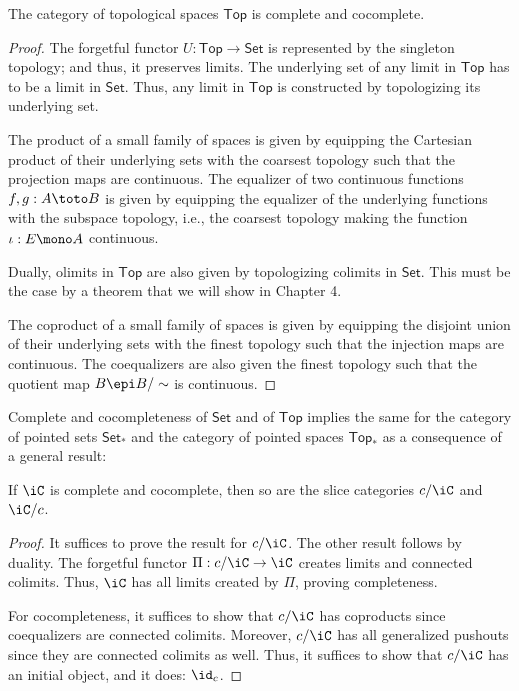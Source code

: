 \documentclass{amsart}
\begin{document}
\begin{thm}
  The category of topological spaces $\mathsf{Top}$ is complete and cocomplete.
\end{thm}
\begin{proof}
  The forgetful functor $U : \mathsf{Top} \to \mathsf{Set}$ is represented by the singleton topology; and thus, it preserves limits.
  The underlying set of any limit in $\mathsf{Top}$ has to be a limit in $\mathsf{Set}$.
  Thus, any limit in $\mathsf{Top}$ is constructed by topologizing its underlying set.

  The product of a small family of spaces is given by equipping the Cartesian product of their underlying sets with the coarsest topology such that the projection maps are continuous.
  The equalizer of two continuous functions $f,g : A \toto B$ is given by equipping the equalizer of the underlying functions with the subspace topology, i.e., the coarsest topology making the function $\iota : E \mono A$ continuous.

  Dually, olimits in $\mathsf{Top}$ are also given by topologizing colimits in $\mathsf{Set}$.
  This must be the case by a theorem that we will show in Chapter 4.

  The coproduct of a small family of spaces is given by equipping the disjoint union of their underlying sets with the finest topology such that the injection maps are continuous.
  The coequalizers are also given the finest topology such that the quotient map $B \epi B/\sim$ is continuous.
\end{proof}

Complete and cocompleteness of $\mathsf{Set}$ and of $\mathsf{Top}$ implies the same for the category of pointed sets $\mathsf{Set}_{*}$ and the category of pointed spaces $\mathsf{Top}_{*}$ as a consequence of a general result:
\begin{thm}
  If $\iC$ is complete and cocomplete, then so are the slice categories $c/\iC$ and $\iC/c$. 
\end{thm}
\begin{proof}
  It suffices to prove the result for $c/\iC$.
  The other result follows by duality.
  The forgetful functor $\Pi : c/\iC \to \iC$ creates limits and connected colimits.
  Thus, $\iC$ has all limits created by $\Pi$, proving completeness.
  
  For cocompleteness, it suffices to show that $c/\iC$ has coproducts since coequalizers are connected colimits.
  Moreover, $c/\iC$ has all generalized pushouts since they are connected colimits as well.
  Thus, it suffices to show that $c/\iC$ has an initial object, and it does: $\id_{c}$.
\end{proof}



\end{document}

